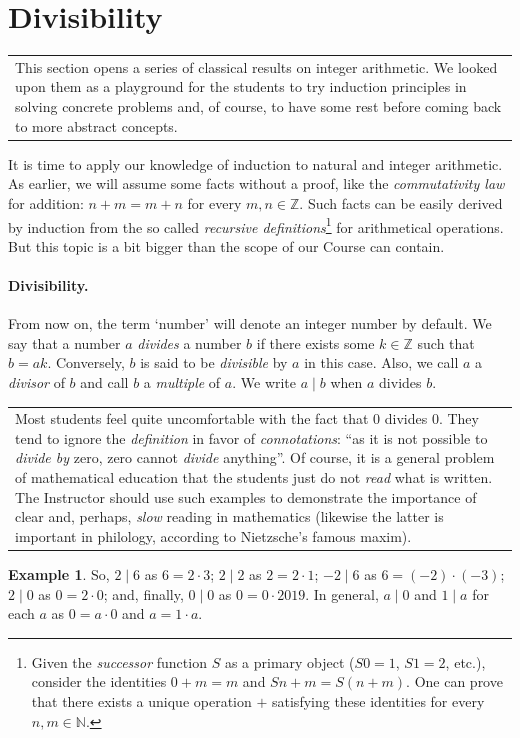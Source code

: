 \documentclass[12pt,notitlepage]{article}
\theoremstyle{plain}
\theoremstyle{definition}
\newtheorem{exm}[thm]{Example}
\theoremstyle{plain}
\newcommand{\N}{\mathbb{N}}
\newcommand{\Z}{\mathbb{Z}}
\newcommand{\1}{\mathbf{1}}
\newcommand{\0}{\mathbf{0}}
\newcommand{\dvd}{\mathop{\mid}}
\newcommand{\mcomm}[1]{
\medskip\noindent\begin{tabular}{| l}
\parbox{0.99\textwidth}{{\small
#1 }}\end{tabular}
\smallskip}
\begin{document}
\section{Divisibility}
\mcomm{This section opens a series of classical results on integer arithmetic. We looked upon them as a playground for the students to try induction principles in solving concrete problems  and, of course, to have some rest before coming back to more abstract concepts.}

It is time to apply our knowledge of induction to natural and integer arithmetic. As earlier, we will assume some facts without a proof, like the \emph{commutativity law} for addition: $n + m = m + n$ for every $m, n \in \Z$. Such facts can be easily derived by induction from the so called \emph{recursive definitions}\footnote{Given the \emph{successor} function $S$ as a primary object ($S 0 = 1$, $S 1 = 2$, etc.), consider the identities $0 + m = m$ and $S n + m = S(n + m)$. One can prove that there exists a unique operation ${+}$ satisfying these identities for every $n, m  \in \N$.} for arithmetical operations. But this topic is a bit bigger than the scope of our Course can contain.

\paragraph{Divisibility.} From now on, the term `number' will denote an integer number by default. We say that a number $a$ \emph{divides} a number $b$ if there exists some $k \in \Z$ such that $b = ak$. Conversely, $b$ is said to be \emph{divisible} by $a$ in this case. Also, we call $a$ a \emph{divisor} of $b$ and call $b$ a \emph{multiple} of $a$. We write $a \dvd b$ when $a$ divides $b$.

\mcomm{Most students feel quite uncomfortable with the fact that $0$ divides $0$. They tend to ignore the \emph{definition} in favor of \emph{connotations}: ``as it is not possible to \emph{divide by} zero, zero cannot \emph{divide} anything''. Of course, it is a general problem of mathematical education that the students just do not \emph{read} what is written.  The Instructor should use such examples to demonstrate the importance of clear and, perhaps, \emph{slow} reading in mathematics (likewise the latter is important in philology, according to Nietzsche's famous maxim).}
\begin{exm}
So, $2 \dvd 6$ as $6 = 2 \cdot 3$; $2 \dvd 2$ as $2 = 2 \cdot 1$; $-2 \dvd 6$ as $6 = (-2) \cdot (-3)$; $2 \dvd 0$ as $0 = 2 \cdot 0$; and, finally, $0 \dvd 0$ as $0 = 0 \cdot 2019$. In general, $a \dvd 0$  and $1 \dvd a$ for each $a$ as $0 = a \cdot 0$ and $a = 1 \cdot a$.
\end{exm}
\end{document}

